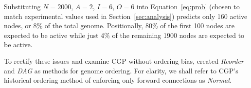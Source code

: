 \documentclass[journal]{IEEEtran}
\begin{document}

Substituting $N=2000$, $A=2$, $I=6$, $O=6$ into Equation~\ref{eq:prob} (chosen to match
experimental values used in Section~\ref{sec:analysis})
predicts only 160 active nodes, or 8\% of the total genome.  Positionally, 80\% of the first 100 nodes are expected to be
active while just 4\% of the remaining 1900 nodes are expected to be active.

To rectify these issues and examine CGP without ordering bias, \cite{goldman:2013:ordering}
created \emph{Reorder} and \emph{DAG} as methods for genome ordering.
For clarity, we shall refer to CGP's historical ordering method of enforcing
only forward connections as \emph{Normal}.
\end{document}
